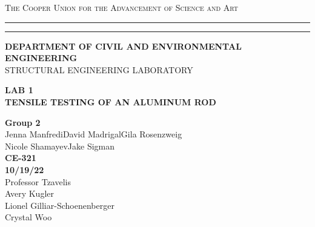 \begin{titlepage}
    \begin{center}
    {{\Large{\textsc{The Cooper Union for the Advancement of Science and Art}}}} \rule[0.1cm]{15.8cm}{0.1mm}
    \rule[0.5cm]{15.8cm}{0.6mm}
    {\small{\bf DEPARTMENT OF CIVIL AND ENVIRONMENTAL ENGINEERING}}\\
    {\footnotesize{STRUCTURAL ENGINEERING LABORATORY}}
    \end{center}
    \vspace{15mm}
    \begin{center}
    {\large{\bf LAB 1\\}}
    \vspace{5mm}
    {\Large{\bf TENSILE TESTING OF AN ALUMINUM ROD}}
    \end{center}
    \vspace{35mm}
    \par
    \noindent
    \hfill
    \vspace{20mm}
    \begin{center}
    {\large{ {\bf Group 2} \\ { Jenna Manfredi\hspace{5mm}David Madrigal\hspace{5mm}Gila Rosenzweig\\Nicole Shamayev\hspace{5mm}Jake Sigman}}}
    \vspace{40mm}
    {\large {\bf \\CE-321 \\ 10/19/22 \\}}
    \vspace{15mm}
    {\normalsize{Professor Tzavelis \\ Avery Kugler \\ Lionel Gilliar-Schoenenberger \\ Crystal Woo}}
    \end{center}
\end{titlepage}